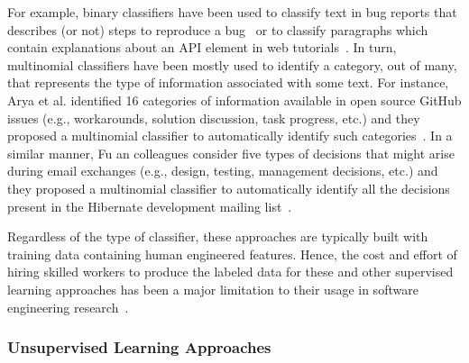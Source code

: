For example, binary classifiers have been used 
to classify text in bug reports that describes (or not) steps to reproduce a bug~\cite{Chaparro2016}
or  to classify paragraphs which contain explanations 
about an API element  in web tutorials~\cite{Petrosyan2015}.
In turn, multinomial classifiers have been mostly used 
to identify a category, out of many, that represents the type of information 
associated with some text. For instance, Arya et al. identified 16 categories of  information available
in open source GitHub issues (e.g., workarounds, solution discussion, task progress, etc.)
and they proposed a multinomial classifier 
to automatically identify such categories~\cite{Arya2019}.
In a similar manner, Fu an colleagues consider 
five types of decisions that might arise during 
email exchanges (e.g., design, testing, management decisions, etc.)
and they proposed a multinomial classifier 
to automatically identify all the decisions present in 
the Hibernate development mailing list~\cite{fu2021}.





Regardless of the type of classifier, these approaches are typically built 
with training data containing human engineered features.
Hence, the cost and effort of hiring skilled workers to produce 
the labeled data for these and other supervised learning approaches
has been a major limitation to their usage in software engineering research~\cite{Arpteg2018, ferreira2021}.




\subsubsection{Unsupervised Learning Approaches}















